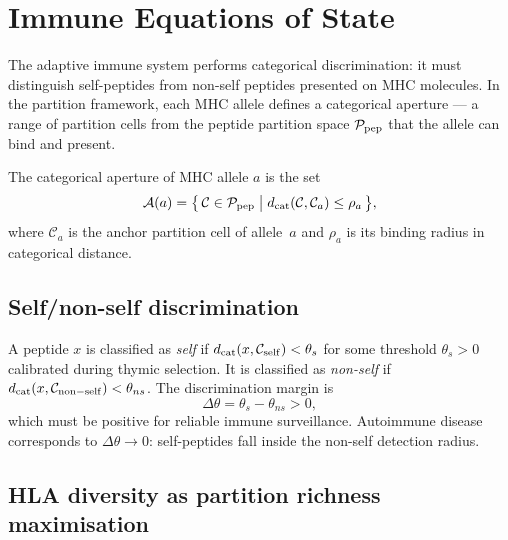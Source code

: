 \section{Immune Equations of State}
\label{sec:immune}

The adaptive immune system performs categorical discrimination: it must
distinguish self-peptides from non-self peptides presented on MHC molecules.
In the partition framework, each MHC allele defines a categorical aperture —
a range of partition cells from the peptide partition space $\mathcal{P}_{\mathrm{pep}}$
that the allele can bind and present.

\begin{definition}
\label{def:mhc-aperture}
The categorical aperture of MHC allele $a$ is the set
\begin{equation}
  \mathcal{A}(a)
  = \bigl\{\,\mathcal{C} \in \mathcal{P}_{\mathrm{pep}}
    \;\big|\; d_{\mathrm{cat}}(\mathcal{C}, \mathcal{C}_a) \leq \rho_a\,\bigr\},
  \label{eq:mhc-aperture}
\end{equation}
where $\mathcal{C}_a$ is the anchor partition cell of allele~$a$ and
$\rho_a$ is its binding radius in categorical distance.
\end{definition}

\subsection{Self/non-self discrimination}

A peptide $x$ is classified as \emph{self} if
$d_{\mathrm{cat}}(x, \mathcal{C}_{\mathrm{self}}) < \theta_s$ for some threshold
$\theta_s > 0$ calibrated during thymic selection.  It is classified as
\emph{non-self} if $d_{\mathrm{cat}}(x, \mathcal{C}_{\mathrm{non-self}}) < \theta_{ns}$.
The discrimination margin is
\begin{equation}
  \Delta\theta = \theta_s - \theta_{ns} > 0,
  \label{eq:discrimination-margin}
\end{equation}
which must be positive for reliable immune surveillance.  Autoimmune disease
corresponds to $\Delta\theta \to 0$: self-peptides fall inside the non-self
detection radius.

\subsection{HLA diversity as partition richness maximisation}

